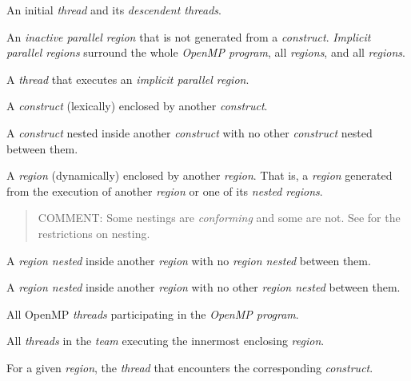 \glossarydefstart
An initial \emph{thread} and its \emph{descendent threads}.
\glossarydefend

\glossarydefstart
An \emph{inactive parallel region} that is not generated from a
 \emph{construct}. \emph{Implicit parallel regions} surround the whole
\emph{OpenMP program}, all  \emph{regions}, and all 
\emph{regions}.

\glossarydefend

\glossarydefstart
A \emph{thread} that executes an \emph{implicit parallel region}.
\glossarydefend

\glossarydefstart
A \emph{construct} (lexically) enclosed by another \emph{construct}.
\glossarydefend

\glossarydefstart
A \emph{construct} nested inside another \emph{construct} with no other \emph{construct} nested 
between them.
\glossarydefend

\glossarydefstart
A \emph{region} (dynamically) enclosed by another \emph{region}.  That is, a
\emph{region} generated from the execution of another \emph{region}
or one of its \emph{nested regions}.

\begin{quote}
COMMENT: Some nestings are \emph{conforming} and some are not. 
See  for the restrictions on nesting.
\end{quote}
\glossarydefend

\glossarydefstart
A \emph{region nested} inside another \emph{region} with no  \emph{region nested} between 
them. 
\glossarydefend

\glossarydefstart
A \emph{region nested} inside another \emph{region} with no other \emph{region nested} between 
them. 
\glossarydefend

\glossarydefstart
All OpenMP \emph{threads} participating in the \emph{OpenMP program}.
\glossarydefend

\glossarydefstart
All \emph{threads} in the \emph{team} executing the innermost enclosing  \emph{region}.
\glossarydefend

\glossarydefstart
For a given \emph{region}, the \emph{thread} that encounters the 
corresponding \emph{construct}.
\glossarydefend


